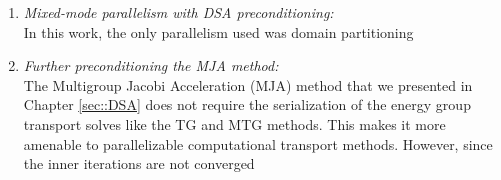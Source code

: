 \begin{enumerate}
\item {\em Mixed-mode parallelism with DSA preconditioning:} \\
In this work, the only parallelism used was domain partitioning 
\item {\em Further preconditioning the MJA method:} \\
The Multigroup Jacobi Acceleration (MJA) method that we presented in Chapter \ref{sec::DSA} does not require the serialization of the energy group transport solves like the TG and MTG methods. This makes it more amenable to parallelizable computational transport methods. However, since the inner iterations are not converged 
\end{enumerate}